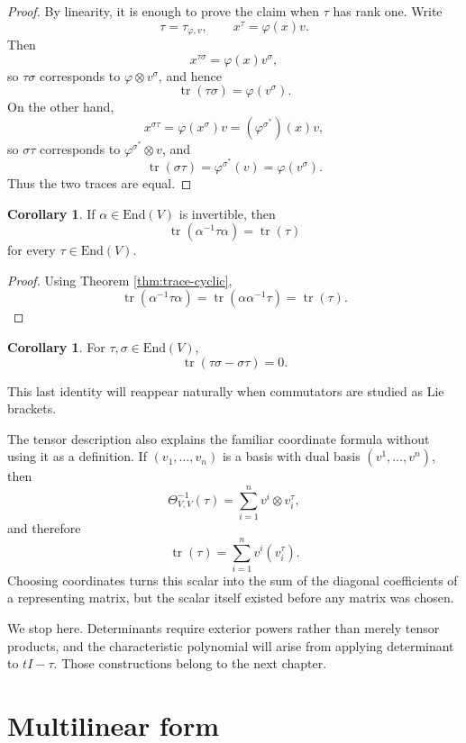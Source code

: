 \documentclass{amsbook}
\theoremstyle{definition}
\newtheorem{corollary}[theorem]{Corollary}
\theoremstyle{remark}
\newcommand{\End}{\mathrm{End}}
\newcommand{\tr}{\operatorname{tr}}
\numberwithin{section}{chapter}
\numberwithin{equation}{chapter}
\begin{document}
\begin{proof}
By linearity, it is enough to prove the claim when $\tau$ has rank one. Write
\[
\tau=\tau_{\varphi,v},
\qquad
x^\tau=\varphi(x)v.
\]
Then
\[
x^{\tau\sigma}=\varphi(x)v^\sigma,
\]
so $\tau\sigma$ corresponds to $\varphi\otimes v^\sigma$, and hence
\[
\tr(\tau\sigma)=\varphi(v^\sigma).
\]
On the other hand,
\[
x^{\sigma\tau}=\varphi(x^\sigma)v=(\varphi^{\sigma^*})(x)v,
\]
so $\sigma\tau$ corresponds to $\varphi^{\sigma^*}\otimes v$, and
\[
\tr(\sigma\tau)
=
\varphi^{\sigma^*}(v)
=
\varphi(v^\sigma).
\]
Thus the two traces are equal.
\end{proof}

\begin{corollary}\label{cor:trace-conjugation}
If $\alpha\in\End(V)$ is invertible, then
\[
\tr(\alpha^{-1}\tau\alpha)=\tr(\tau)
\]
for every $\tau\in\End(V)$.
\end{corollary}

\begin{proof}
Using Theorem \ref{thm:trace-cyclic},
\[
\tr(\alpha^{-1}\tau\alpha)
=
\tr(\alpha\alpha^{-1}\tau)
=
\tr(\tau).
\]
\end{proof}

\begin{corollary}\label{cor:trace-commutator}
For $\tau,\sigma\in\End(V)$,
\[
\tr(\tau\sigma-\sigma\tau)=0.
\]
\end{corollary}

This last identity will reappear naturally when commutators are studied as Lie brackets.

The tensor description also explains the familiar coordinate formula without using it as a definition. If $(v_1,\dots,v_n)$ is a basis with dual basis $(v^1,\dots,v^n)$, then
\[
\Theta_{V,V}^{-1}(\tau)
=
\sum_{i=1}^n v^i\otimes v_i^\tau,
\]
and therefore
\[
\tr(\tau)=\sum_{i=1}^n v^i(v_i^\tau).
\]
Choosing coordinates turns this scalar into the sum of the diagonal coefficients of a representing matrix, but the scalar itself existed before any matrix was chosen.

We stop here. Determinants require exterior powers rather than merely tensor products, and the characteristic polynomial will arise from applying determinant to $tI-\tau$. Those constructions belong to the next chapter.

\chapter{Multilinear form}
\end{document}
